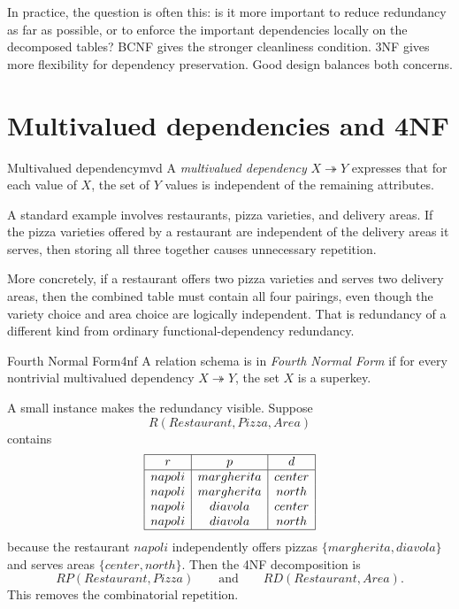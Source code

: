 \documentclass[11pt,a4paper,openany]{book}
\begin{document}
In practice, the question is often this: is it more important to reduce redundancy as far as possible, or to enforce the important dependencies locally on the decomposed tables? BCNF gives the stronger cleanliness condition. 3NF gives more flexibility for dependency preservation. Good design balances both concerns.

\section{Multivalued dependencies and 4NF}
\begin{definition}{Multivalued dependency}{mvd}
A \emph{multivalued dependency} \(X \twoheadrightarrow Y\) expresses that for each value of \(X\), the set of \(Y\) values is independent of the remaining attributes.
\end{definition}

A standard example involves restaurants, pizza varieties, and delivery areas. If the pizza varieties offered by a restaurant are independent of the delivery areas it serves, then storing all three together causes unnecessary repetition.

More concretely, if a restaurant offers two pizza varieties and serves two delivery areas, then the combined table must contain all four pairings, even though the variety choice and area choice are logically independent. That is redundancy of a different kind from ordinary functional-dependency redundancy.

\begin{definition}{Fourth Normal Form}{4nf}
A relation schema is in \emph{Fourth Normal Form} if for every nontrivial multivalued dependency \(X \twoheadrightarrow Y\), the set \(X\) is a superkey.
\end{definition}

A small instance makes the redundancy visible. Suppose
\[
R(Restaurant, Pizza, Area)
\]
contains
\[
\begin{array}{|c|c|c|}\hline
r&p&d\\\hline
napoli&margherita&center\\
napoli&margherita&north\\
napoli&diavola&center\\
napoli&diavola&north\\\hline
\end{array}
\]
because the restaurant \(napoli\) independently offers pizzas \(\{margherita, diavola\}\) and serves areas \(\{center, north\}\).
Then the 4NF decomposition is
\[
RP(Restaurant, Pizza)
\qquad\text{and}\qquad
RD(Restaurant, Area).
\]
This removes the combinatorial repetition.
\end{document}
